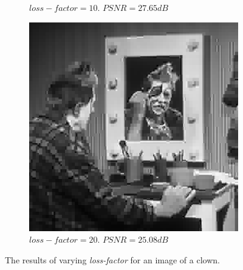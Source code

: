 \documentclass[11pt,a4paper]{article}
\begin{document}
\begin{figure}[ht]
\begin{subfigure}[h]{0.4\textwidth}
		\caption{$loss-factor = 10$. $PSNR = 27.65dB$}
		\label{clown:10}
	\end{subfigure}
	\par\bigskip
	\begin{subfigure}[h]{0.4\textwidth}
		\includegraphics[width=\textwidth]{clown_lf20}
		\caption{$loss-factor = 20$. $PSNR = 25.08dB$}
		\label{clown:20}
	\end{subfigure}
	\caption{The results of varying \textit{loss-factor} for an image of a clown.}
	\label{clown:loss}
\end{figure}

\clearpage
\end{document}
